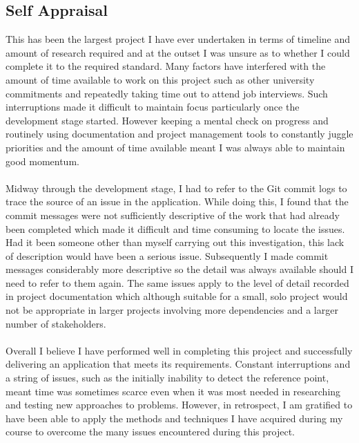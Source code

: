 	\subsection{Self Appraisal}
		This has been the largest project I have ever undertaken in terms of timeline and amount of research required and at the outset I was unsure as to whether I could  complete it to the required standard. Many factors have interfered with the amount of time available to work on this project such as other university commitments and repeatedly taking time out to attend job interviews. Such interruptions made it difficult to maintain focus particularly once the development stage started. However keeping a mental check on progress and routinely using documentation and project management tools to constantly juggle priorities and the amount of time available meant I was always able to maintain good momentum.
		\\\\
		Midway through the development stage, I had to refer to the Git commit logs to trace the source of an issue in the application. While doing this, I found that the commit messages were not sufficiently descriptive of the work that had already been completed which made
		it difficult and time consuming to locate the issues. Had it been someone other than myself carrying out this investigation, this lack of description would have been a serious issue. Subsequently I made commit messages considerably more descriptive so the detail was always available should I need to refer to them again. The same issues apply to the level of detail recorded in project documentation which although suitable for a small, solo project would not be appropriate in larger projects involving more dependencies and a larger number of stakeholders. 
		\\\\
		Overall I believe I have performed well in completing this project and successfully delivering an application that meets its requirements. Constant interruptions and a string of issues, such as the initially inability to detect the reference point, meant time was sometimes scarce even when it was most needed in researching and testing new approaches to problems. However, in retrospect, I am gratified to have been able to apply the methods and techniques I have acquired during my course to overcome the many issues encountered during this project.
		